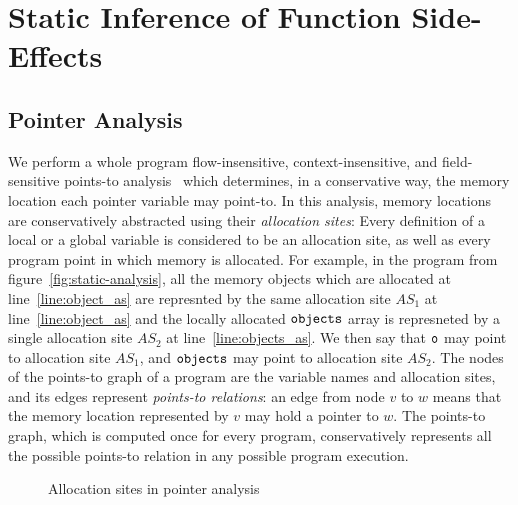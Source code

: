 
\section{Static Inference of Function Side-Effects}
\label{Se:MayMod}
\label{Se:IdentifyingLoads}


\subsection{Pointer Analysis}
We perform a whole program flow-insensitive, context-insensitive, and field-sensitive
points-to analysis~\cite{Hind:Paste2001, Smaragdakis:FTPL2015} which
determines, in a conservative way, the memory location each pointer
variable may point-to. In this analysis, memory locations are
conservatively abstracted using their \emph{allocation sites}: Every
definition of a local or a global variable is considered to be an
allocation site, as well as every program point in which memory is
allocated.
For example, in the program from figure~\ref{fig:static-analysis},
all the memory objects which are allocated at line~\ref{line:object_as}
are represnted by the same allocation site $\mathit{AS_1}$ at line~\ref{line:object_as}
and the locally allocated $\texttt{objects}$ array is represneted
by a single allocation site $\mathit{AS_2}$ at line~\ref{line:objects_as}.
We then say that $\texttt{o}$ may point to allocation
site $\mathit{AS_1}$, and $\texttt{objects}$ may point to allocation site $\mathit{AS_2}$.
The nodes of the points-to graph of a
program are the variable names and allocation sites, and its edges
represent \emph{points-to relations}:
an edge from node $v$ to $w$ means that the memory location
represented by $v$ may hold a pointer to $w$.
The points-to graph, which is computed once for every program,
conservatively represents all the possible points-to relation in any
possible program execution. 

\begin{figure*}[t]
  \centering
  \subfloat[]{
    
    \label{fig:static-analysis}
  }
  \caption{Allocation sites in pointer analysis}
  \label{fig:simple}
\end{figure*}

